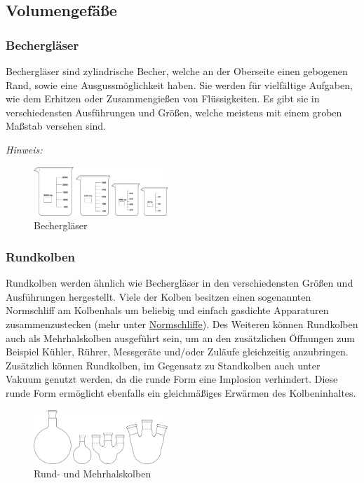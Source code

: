 \subsection{Volumengefäße}
\subsubsection*{Bechergläser}
Bechergläser sind zylindrische Becher, welche an der Oberseite einen gebogenen Rand, sowie eine Ausgussmöglichkeit haben. Sie werden für vielfältige Aufgaben, wie dem Erhitzen oder Zusammengießen von Flüssigkeiten. Es gibt sie in verschiedensten Ausführungen und Größen, welche meistens mit einem groben Maßstab versehen sind.\\
\vspace*{-5mm}

\textit{Hinweis:}\\
\vspace*{-5mm}

\begin{figure}[h!]
	\centering
	\includegraphics[width=0.45\textwidth]{img/becherglas}
	\caption{Bechergläser}
	\label{fig:becherglas}
\end{figure}
\FloatBarrier
\vspace*{-10mm}

\subsubsection*{Rundkolben}
Rundkolben werden ähnlich wie Bechergläser in den verschiedensten Größen und Ausführungen hergestellt. Viele der Kolben besitzen einen sogenannten Normschliff am Kolbenhals um beliebig und einfach gasdichte Apparaturen zusammenzustecken (mehr unter \hyperlink{Normschliff}{Normschliffe}). Des Weiteren können Rundkolben auch als Mehrhalskolben ausgeführt sein, um an den zusätzlichen Öffnungen zum Beispiel Kühler, Rührer, Messgeräte und/oder Zuläufe gleichzeitig anzubringen. Zusätzlich können Rundkolben, im Gegensatz zu Standkolben auch unter Vakuum genutzt werden, da die runde Form eine Implosion verhindert. Diese runde Form ermöglicht ebenfalls ein gleichmäßiges Erwärmen des Kolbeninhaltes.
\begin{figure}[h!]
	\centering
	\includegraphics[width=0.45\textwidth]{img/rundkolben}
	\caption{Rund- und Mehrhalskolben}
	\label{fig:rundkolben}
\end{figure}
\FloatBarrier

